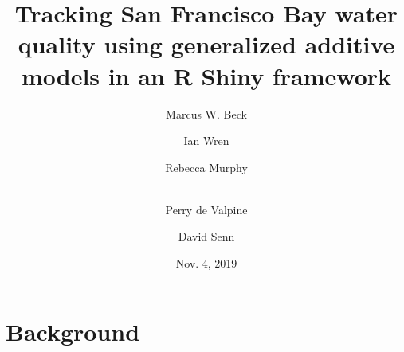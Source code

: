 \documentclass{beamer}
\begin{document}


\title[Tracking SF Bay Water Quality]{Tracking San Francisco Bay water quality using generalized additive models in an R Shiny framework}
\author[Beck et al.]{Marcus W. Beck \and Ian Wren \and Rebecca Murphy \and \\ Perry de Valpine \and David Senn}


\date{Nov. 4, 2019}


\begin{frame}
\titlepage
\end{frame}

\section{Background}
\end{document}
